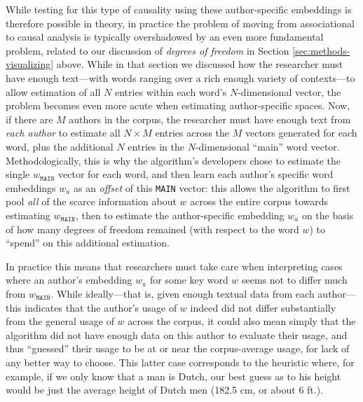 \documentclass[11pt]{article}
\begin{document}
While testing for this type of causality using these author-specific embeddings is therefore possible in theory, in practice the problem of moving from associational to causal analysis is typically overshadowed by an even more fundamental problem, related to our discussion of \textit{degrees of freedom} in Section \ref{sec:methods-visualizing} above. While in that section we discussed how the researcher must have enough text---with words ranging over a rich enough variety of contexts---to allow estimation of all $N$ entries within each word's $N$-dimensional vector, the problem becomes even more acute when estimating author-specific spaces. Now, if there are $M$ authors in the corpus, the researcher must have enough text from \textit{each author} to estimate all $N \times M$ entries across the $M$ vectors generated for each word, plus the additional $N$ entries in the $N$-dimensional ``main'' word vector. Methodologically, this is why the algorithm's developers chose to estimate the single $w_\texttt{MAIN}$ vector for each word, and then learn each author's specific word embeddings $w_a$ as an \textit{offset} of this \texttt{MAIN} vector: this allows the algorithm to first pool \textit{all} of the scarce information about $w$ across the entire corpus towards estimating $w_\texttt{MAIN}$, then to estimate the author-specific embedding $w_a$ on the basis of how many degrees of freedom remained (with respect to the word $w$) to ``spend'' on this additional estimation.

In practice this means that researchers must take care when interpreting cases where an author's embedding $w_a$ for some key word $w$ seems not to differ much from $w_\texttt{MAIN}$. While ideally---that is, given enough textual data from each author---this indicates that the author's usage of $w$ indeed did not differ substantially from the general usage of $w$ across the corpus, it could also mean simply that the algorithm did not have enough data on this author to evaluate their usage, and thus ``guessed'' their usage to be at or near the corpus-average usage, for lack of any better way to choose. This latter case corresponds to the heuristic where, for example, if we only know that a man is Dutch, our best guess as to his height would be just the average height of Dutch men (182.5 cm, or about 6 ft.).
\end{document}
